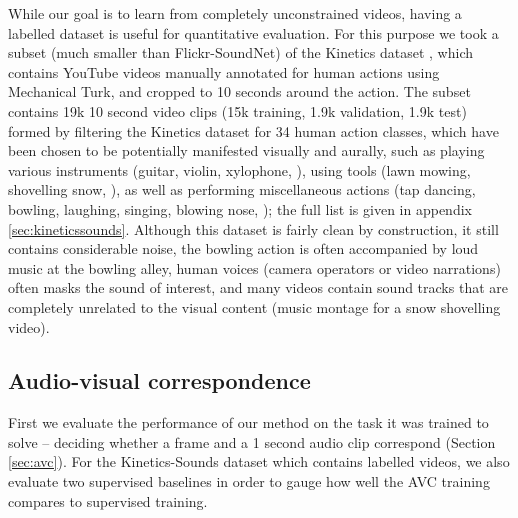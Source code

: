\documentclass[10pt,twocolumn,letterpaper]{article}
\renewcommand{\paragraph}[1]{\smallskip\noindent{\bf{#1}}}
\begin{document}
\paragraph{Kinetics-Sounds.}
While our goal is to learn from completely unconstrained videos,
having a labelled dataset is useful for quantitative evaluation.
For this purpose we took a subset (much smaller than Flickr-SoundNet) of
the Kinetics dataset \cite{Kay17}, which contains YouTube videos
manually annotated for human actions using Mechanical Turk, and cropped
to 10 seconds around the action.
The subset contains 19k 10 second video clips
(15k training, 1.9k validation, 1.9k test)
formed by filtering the Kinetics dataset for 34 human action
classes, which have been chosen to be potentially manifested
visually and aurally, such as
playing various instruments (guitar, violin, xylophone, \etc),
using tools (lawn mowing, shovelling snow, \etc),
as well as performing miscellaneous actions
(tap dancing, bowling, laughing, singing, blowing nose, \etc);
the full list is given in appendix \ref{sec:kineticssounds}.
Although this dataset is fairly clean by construction, it still contains
considerable noise, \eg the bowling action is often accompanied by loud music
at the bowling alley, human voices (camera operators or video narrations)
often masks the sound of interest, and many videos contain sound tracks
that are completely unrelated to the visual content
(\eg music montage for a snow shovelling video).


\subsection{Audio-visual correspondence}

First we evaluate the performance of our method on the task it was trained
to solve -- deciding whether a frame and a 1 second audio clip
correspond (Section \ref{sec:avc}).
For the Kinetics-Sounds dataset which contains labelled videos,
we also evaluate two supervised baselines in order to gauge how well
the AVC training compares to supervised training.
\end{document}

